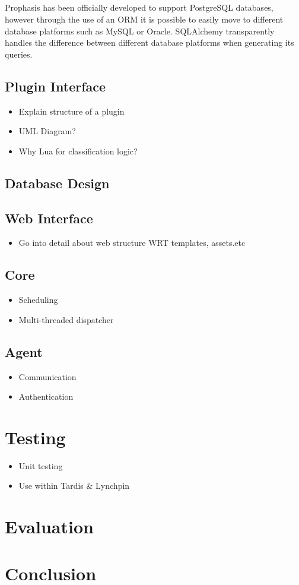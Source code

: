 \documentclass[bsc,logo,twoside]{infthesis}
\begin{document}
\paragraph*{}
	Prophasis has been officially developed to support PostgreSQL databases,
	however through the use of an ORM it is possible to easily move to different
	database platforms such as MySQL or Oracle.  SQLAlchemy transparently handles
	the difference between different database platforms when generating its
	queries.
	

\section{Plugin Interface}
\begin{itemize}
	\item Explain structure of a plugin
	\item UML Diagram?
	\item Why Lua for classification logic?
\end{itemize}

\section{Database Design}

\section{Web Interface}
\begin{itemize}
	\item Go into detail about web structure WRT templates, assets.etc
\end{itemize}

\section{Core}
\begin{itemize}
	\item Scheduling
	\item Multi-threaded dispatcher
\end{itemize}

\section{Agent}
\begin{itemize}
	\item Communication
	\item Authentication
\end{itemize}

\chapter{Testing}
\begin{itemize}
	\item Unit testing
	\item Use within Tardis \& Lynchpin
\end{itemize}
	
\chapter{Evaluation}

\chapter{Conclusion}
\end{document}
